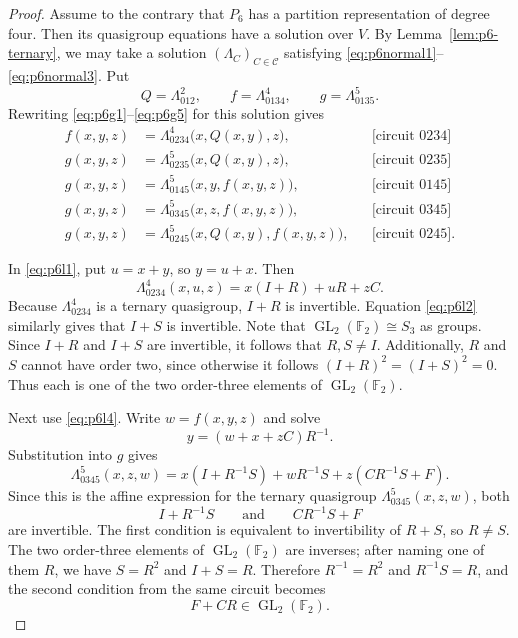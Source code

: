 \documentclass[preprint,12pt]{elsarticle}
\theoremstyle{definition}
\newcommand{\F}{\mathbb F}
\newcommand{\GL}{\operatorname{GL}}
\newcommand{\circuittag}[1]{\text{[circuit $#1$]}}
\begin{document}
\begin{proof}
Assume to the contrary that $P_6$ has a partition representation of degree
four. Then its quasigroup equations have a solution over $V$. By
Lemma~\ref{lem:p6-ternary}, we may take a solution
$(\Lambda_C)_{C\in\mathcal C}$ satisfying
\eqref{eq:p6normal1}--\eqref{eq:p6normal3}. Put
\[
Q=\Lambda_{012}^{2},\qquad
f=\Lambda_{0134}^{4},\qquad
g=\Lambda_{0135}^{5}.
\]
Rewriting \eqref{eq:p6g1}--\eqref{eq:p6g5} for this solution gives
\begin{align}
f(x,y,z)&=\Lambda_{0234}^{4}\bigl(x,Q(x,y),z\bigr),
&&\circuittag{0234}\label{eq:p6l1}\\
g(x,y,z)&=\Lambda_{0235}^{5}\bigl(x,Q(x,y),z\bigr),
&&\circuittag{0235}\label{eq:p6l2}\\
g(x,y,z)&=\Lambda_{0145}^{5}\bigl(x,y,f(x,y,z)\bigr),
&&\circuittag{0145}\label{eq:p6l3}\\
g(x,y,z)&=\Lambda_{0345}^{5}\bigl(x,z,f(x,y,z)\bigr),
&&\circuittag{0345}\label{eq:p6l4}\\
g(x,y,z)&=\Lambda_{0245}^{5}\bigl(x,Q(x,y),f(x,y,z)\bigr),
&&\circuittag{0245}.\label{eq:p6l5}
\end{align}

In \eqref{eq:p6l1}, put $u=x+y$, so $y=u+x$. Then
\[
\Lambda_{0234}^{4}(x,u,z)=x(I+R)+uR+zC.
\]
Because $\Lambda_{0234}^{4}$ is a ternary quasigroup, $I+R$ is invertible.
Equation \eqref{eq:p6l2} similarly gives that $I+S$ is invertible. Note that 
$\GL_2(\F_2) \cong S_3$ as groups. Since $I+R$ and $I+S$ are invertible, it follows
that $R,S \neq I$. Additionally, $R$ and $S$ cannot have order two, since otherwise it follows $(I+R)^2 = (I+S)^2 = 0$.
Thus each is one of the two order-three elements of $\GL_2(\F_2)$.

Next use \eqref{eq:p6l4}. Write $w=f(x,y,z)$ and solve
\[
y=(w+x+zC)R^{-1}.
\]
Substitution into $g$ gives
\[
\Lambda_{0345}^5(x,z,w)=x(I+R^{-1}S)+wR^{-1}S+z(CR^{-1}S+F).
\]
Since this is the affine expression for the ternary quasigroup
$\Lambda_{0345}^{5}(x,z,w)$, both
\[
I+R^{-1}S\qquad\text{and}\qquad CR^{-1}S+F
\]
are invertible. The first condition is equivalent to invertibility of $R+S$,
so $R\ne S$. The two order-three elements of $\GL_2(\F_2)$ are inverses;
after naming one of them $R$, we have $S=R^2$ and $I + S = R$. Therefore
$R^{-1}=R^2$ and $R^{-1}S=R$, and the second condition from the same circuit
becomes
\begin{equation}\label{eq:p6condCR}
F+CR\in\GL_2(\F_2).
\end{equation}


\end{proof}
\end{document}
